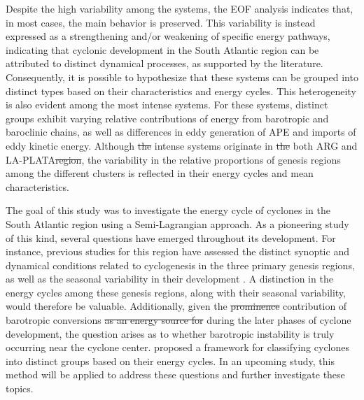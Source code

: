\documentclass[pdflatex,sn-chicago]{sn-jnl}%
\makeatletter
\theoremstyle{plain}
\theoremstyle{definition}
\theoremstyle{remark}
\theoremstyle{definition}
\providecommand{\DIFaddtex}[1]{{\protect\color{blue}#1}} %
\providecommand{\DIFdeltex}[1]{{\protect\color{red}\sout{#1}}} %
\providecommand{\DIFaddbegin}{} %
\providecommand{\DIFaddend}{} %
\providecommand{\DIFdelbegin}{} %
\providecommand{\DIFdelend}{} %
\providecommand{\DIFadd}[1]{\texorpdfstring{\DIFaddtex{#1}}{#1}} %
\providecommand{\DIFdel}[1]{\texorpdfstring{\DIFdeltex{#1}}{}} %
\let\sout@orig\sout %
\renewcommand{\sout}[1]{\ifmmode\text{\sout@orig{\ensuremath{#1}}}\else\sout@orig{#1}\fi} %
\makeatother
\begin{document}
Despite the high variability among the systems, the EOF analysis indicates that, in most cases, the main behavior is preserved. This variability is instead expressed as a strengthening and/or weakening of specific energy pathways, indicating that cyclonic development in the South Atlantic region can be attributed to distinct dynamical processes, as supported by the literature. Consequently, it is possible to hypothesize that these systems can be grouped into distinct types based on their characteristics and energy cycles. This heterogeneity is also evident among the most intense systems. For these systems, distinct groups exhibit varying relative contributions of energy from barotropic and baroclinic chains, as well as differences in eddy generation of APE and imports of eddy kinetic energy. Although \DIFdelbegin \DIFdel{the }\DIFdelend intense systems originate in \DIFdelbegin \DIFdel{the }\DIFdelend \DIFaddbegin \DIFadd{both ARG and }\DIFaddend LA-PLATA\DIFdelbegin \DIFdel{region}\DIFdelend , the variability in the relative proportions of genesis regions among the different clusters is reflected in their energy cycles and mean characteristics.

The goal of this study was to investigate the energy cycle of cyclones in the South Atlantic region using a Semi-Lagrangian approach. As a pioneering study of this kind, several questions have emerged throughout its development. For instance, previous studies for this region have assessed the distinct synoptic and dynamical conditions related to cyclogenesis in the three primary genesis regions, as well as the seasonal variability in their development \citep{gramcianinov2019properties, crespo2021potential}. A distinction in the energy cycles among these genesis regions, along with their seasonal variability, would therefore be valuable. Additionally, given the \DIFdelbegin \DIFdel{prominence }\DIFdelend \DIFaddbegin \DIFadd{contribution }\DIFaddend of barotropic conversions \DIFdelbegin \DIFdel{as an energy source for }\DIFdelend \DIFaddbegin \DIFadd{during the later phases of }\DIFaddend cyclone development, the question arises as to whether barotropic instability is truly occurring near the cyclone center. \citet{souza2024thesis} proposed a framework for classifying cyclones into distinct groups based on their energy cycles. In an upcoming study, this method will be applied to address these questions and further investigate these topics.


\backmatter


\end{document}
